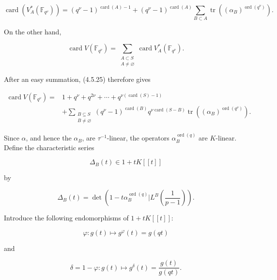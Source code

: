 \begin{equation}\tag{4.5.25}
\operatorname{card}(V_A^*(\mathbb F_{q^\nu}))
=(q^\nu-1)^{\operatorname{card}(A)-1}
+(q^\nu-1)^{\operatorname{card}(A)}
\sum_{B\subset A}
\operatorname{tr}\!\left((\alpha_B)^{\operatorname{ord}(q^\nu)}\right).
\end{equation}

On the other hand,

\begin{equation}\tag{4.5.26}
\operatorname{card}V(\mathbb F_{q^\nu})
=\sum_{\substack{A\subset S\\A\ne\varnothing}}
\operatorname{card}V_A^*(\mathbb F_{q^\nu}).
\end{equation}

After an easy summation, (4.5.25) therefore gives

\begin{equation}\tag{4.5.27}
\begin{aligned}
\operatorname{card}V(\mathbb F_{q^\nu})
={}&1+q^\nu+q^{2\nu}+\cdots
+q^{\nu(\operatorname{card}(S)-1)}\\
&+\sum_{\substack{B\subseteq S\\B\ne\varnothing}}
(q^\nu-1)^{\operatorname{card}(B)}
q^{\nu\operatorname{card}(S-B)}
\operatorname{tr}\!\left((\alpha_B)^{\operatorname{ord}(q^\nu)}\right).
\end{aligned}
\end{equation}

Since $\alpha$, and hence the $\alpha_B$, are $\tau^{-1}$-linear, the
operators $\alpha_B^{\operatorname{ord}(q)}$ are $K$-linear. Define the
characteristic series

\[
\Delta_B(t)\in1+tK[[t]]
\]

by

\begin{equation}\tag{4.5.28}
\Delta_B(t)=\det\!\left(
1-t\alpha_B^{\operatorname{ord}(q)}
\mathrel{\Big|}L^B\!\left(\frac1{p-1}\right)\right).
\end{equation}

Introduce the following endomorphisms of $1+tK[[t]]$:

\begin{equation}\tag{4.5.29}
\varphi:g(t)\longmapsto g^\varphi(t)=g(qt)
\end{equation}

and

\begin{equation}\tag{4.5.30}
\delta=1-\varphi:g(t)\longmapsto
g^\delta(t)=\frac{g(t)}{g(qt)}.
\end{equation}
